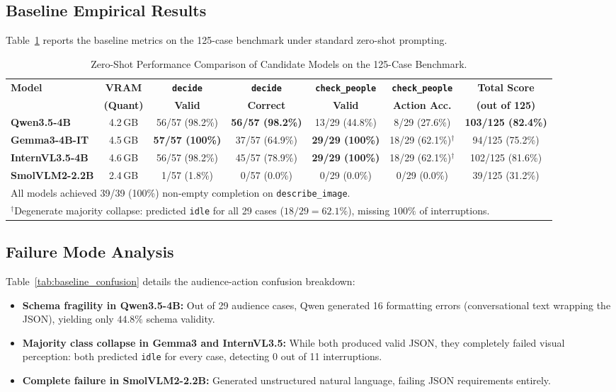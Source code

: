 ﻿\documentclass[11pt,a4paper]{article}
\begin{document}
\subsection{Baseline Empirical Results}
Table~\ref{tab:baseline_comparison} reports the baseline metrics on the 125-case benchmark under standard zero-shot prompting.

\begin{table}[htbp]
\centering
\small
\caption{Zero-Shot Performance Comparison of Candidate Models on the 125-Case Benchmark.}
\label{tab:baseline_comparison}
\begin{tabular*}{\textwidth}{@{\extracolsep{\fill}}lcccccc@{}}
\toprule
\textbf{Model} & \textbf{VRAM} & \textbf{\texttt{decide}} & \textbf{\texttt{decide}} & \textbf{\texttt{check\_people}} & \textbf{\texttt{check\_people}} & \textbf{Total Score} \\
& \textbf{(Quant)} & \textbf{Valid} & \textbf{Correct} & \textbf{Valid} & \textbf{Action Acc.} & \textbf{(out of 125)} \\
\midrule
\textbf{Qwen3.5-4B} & 4.2\,GB & 56/57 (98.2\%) & \textbf{56/57 (98.2\%)} & 13/29 (44.8\%) & 8/29 (27.6\%) & \textbf{103/125 (82.4\%)} \\
\textbf{Gemma3-4B-IT} & 4.5\,GB & \textbf{57/57 (100\%)} & 37/57 (64.9\%) & \textbf{29/29 (100\%)} & 18/29 (62.1\%)$^\dagger$ & 94/125 (75.2\%) \\
\textbf{InternVL3.5-4B} & 4.6\,GB & 56/57 (98.2\%) & 45/57 (78.9\%) & \textbf{29/29 (100\%)} & 18/29 (62.1\%)$^\dagger$ & 102/125 (81.6\%) \\
\textbf{SmolVLM2-2.2B} & 2.4\,GB & 1/57 (1.8\%) & 0/57 (0.0\%) & 0/29 (0.0\%) & 0/29 (0.0\%) & 39/125 (31.2\%) \\
\bottomrule
\multicolumn{7}{l}{\footnotesize All models achieved 39/39 (100\%) non-empty completion on \texttt{describe\_image}.} \\
\multicolumn{7}{l}{\footnotesize $^\dagger$Degenerate majority collapse: predicted \texttt{idle} for all 29 cases ($18/29 = 62.1\%$), missing $100\%$ of interruptions.}
\end{tabular*}
\end{table}

\subsection{Failure Mode Analysis}
Table~\ref{tab:baseline_confusion} details the audience-action confusion breakdown:
\begin{itemize}
    \item \textbf{Schema fragility in Qwen3.5-4B:} Out of 29 audience cases, Qwen generated 16 formatting errors (conversational text wrapping the JSON), yielding only $44.8\%$ schema validity.
    \item \textbf{Majority class collapse in Gemma3 and InternVL3.5:} While both produced valid JSON, they completely failed visual perception: both predicted \texttt{idle} for every case, detecting 0 out of 11 interruptions.
    \item \textbf{Complete failure in SmolVLM2-2.2B:} Generated unstructured natural language, failing JSON requirements entirely.
\end{itemize}
\end{document}
